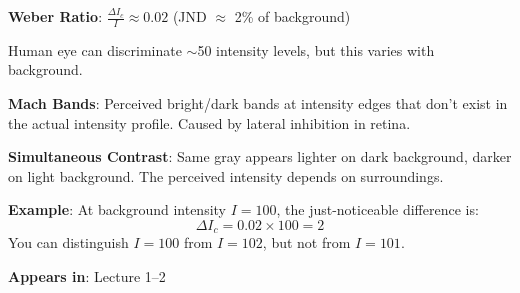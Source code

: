 \documentclass[10pt]{article}
\begin{document}
\begin{conceptbox}

\begin{formulabox}
\textbf{Weber Ratio}: $\frac{\Delta I_c}{I} \approx 0.02$ \hfill (JND $\approx$ 2\% of background)

Human eye can discriminate $\sim$50 intensity levels, but this varies with background.

\textbf{Mach Bands}: Perceived bright/dark bands at intensity edges that don't exist in the actual intensity profile. Caused by lateral inhibition in retina.

\textbf{Simultaneous Contrast}: Same gray appears lighter on dark background, darker on light background. The perceived intensity depends on surroundings.
\end{formulabox}

\begin{examplebox}
\textbf{Example}: At background intensity $I = 100$, the just-noticeable difference is:
\[
\Delta I_c = 0.02 \times 100 = 2
\]
You can distinguish $I = 100$ from $I = 102$, but not from $I = 101$.
\end{examplebox}

\textbf{Appears in}: Lecture 1--2

\end{conceptbox}

\end{document}
